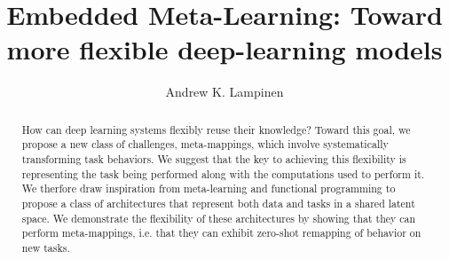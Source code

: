 \documentclass{article}
\begin{document}
\title{Embedded Meta-Learning: Toward more flexible deep-learning models}
\author{Andrew K. Lampinen}
\date{}
\maketitle

\begin{abstract}
How can deep learning systems flexibly reuse their knowledge? Toward this goal, we propose a new class of challenges, meta-mappings, which involve systematically transforming task behaviors. We suggest that the key to achieving this flexibility is representing the task being performed along with the computations used to perform it. We therfore draw inspiration from meta-learning and functional programming to propose a class of architectures that represent both data and tasks in a shared latent space. We demonstrate the flexibility of these architectures by showing that they can perform meta-mappings, i.e. that they can exhibit zero-shot remapping of behavior on new tasks. 
\end{abstract}
\end{document}
